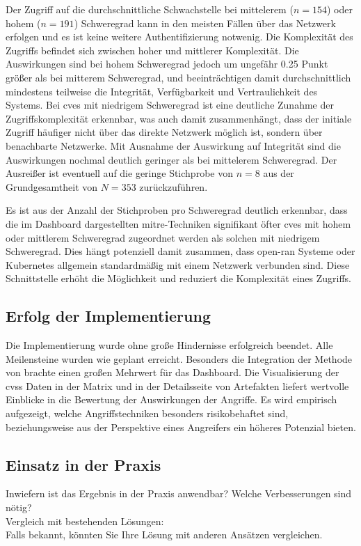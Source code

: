 \par Der Zugriff auf die durchschnittliche Schwachstelle bei mittelerem (\(n = 154\)) oder hohem (\(n = 191\)) Schweregrad kann in den meisten Fällen über das Netzwerk erfolgen und es ist keine weitere Authentifizierung notwenig. Die Komplexität des Zugriffs befindet sich zwischen hoher und mittlerer Komplexität. Die Auswirkungen sind bei hohem Schweregrad jedoch um ungefähr 0.25 Punkt größer als bei mitterem Schweregrad, und beeinträchtigen damit durchschnittlich mindestens teilweise die Integrität, Verfügbarkeit und Vertraulichkeit des Systems. Bei \glspl{cve} mit niedrigem Schweregrad ist eine deutliche Zunahme der Zugriffskomplexität erkennbar, was auch damit zusammenhängt, dass der initiale Zugriff häufiger nicht über das direkte Netzwerk möglich ist, sondern über benachbarte Netzwerke. Mit Ausnahme der Auswirkung auf Integrität sind die Auswirkungen nochmal deutlich geringer als bei mittelerem Schweregrad. Der Ausreißer ist eventuell auf die geringe Stichprobe von \(n = 8\) aus der Grundgesamtheit von \(N = 353\) zurückzuführen.

Es ist aus der Anzahl der Stichproben pro Schweregrad deutlich erkennbar, dass die im Dashboard dargestellten \gls{mitre}-Techniken signifikant öfter \glspl{cve} mit hohem oder mittlerem Schweregrad zugeordnet werden als solchen mit niedrigem Schweregrad. Dies hängt potenziell damit zusammen, dass \gls{open-ran} Systeme oder Kubernetes allgemein standardmäßig mit einem Netzwerk verbunden sind. Diese Schnittstelle erhöht die Möglichkeit und reduziert die Komplexität eines Zugriffs.

\subsection{Erfolg der Implementierung}
Die Implementierung wurde ohne große Hindernisse erfolgreich beendet. Alle Meilensteine wurden wie geplant erreicht. Besonders die Integration der Methode von \citeauthor{klementSecuring6GTransition2024} brachte einen großen Mehrwert für das Dashboard. Die Visualisierung der \gls{cvss} Daten in der Matrix und in der Detailsseite von Artefakten liefert wertvolle Einblicke in die Bewertung der Auswirkungen der Angriffe. Es wird empirisch aufgezeigt, welche Angriffstechniken besonders risikobehaftet sind, beziehungsweise aus der Perspektive eines Angreifers ein höheres Potenzial bieten. 
\subsection{Einsatz in der Praxis}
Inwiefern ist das Ergebnis in der Praxis anwendbar? Welche Verbesserungen sind nötig? \\
Vergleich mit bestehenden Lösungen: \\
Falls bekannt, könnten Sie Ihre Lösung mit anderen Ansätzen vergleichen. \\


